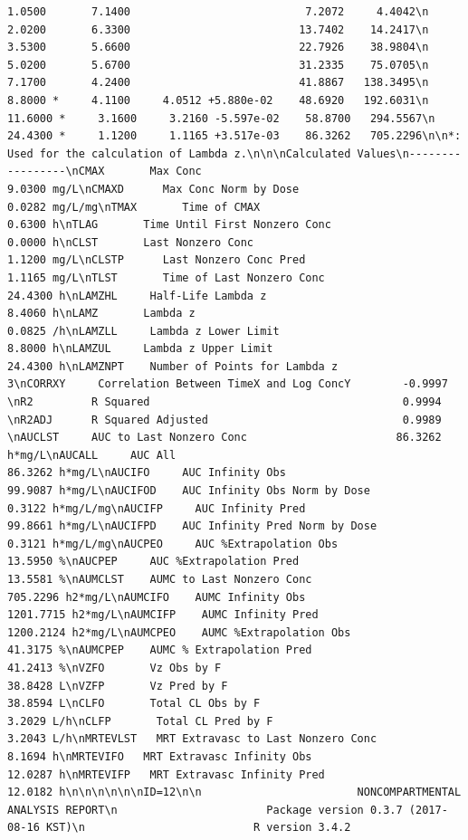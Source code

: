 \documentclass[12pt,]{krantz}
\theoremstyle{definition}
\theoremstyle{definition}
\theoremstyle{definition}
\theoremstyle{remark}
\begin{document}
\begin{verbatim}
1.0500       7.1400                           7.2072     4.4042\n     2.0200       6.3300                          13.7402    14.2417\n     3.5300       5.6600                          22.7926    38.9804\n     5.0200       5.6700                          31.2335    75.0705\n     7.1700       4.2400                          41.8867   138.3495\n     8.8000 *     4.1100     4.0512 +5.880e-02    48.6920   192.6031\n    11.6000 *     3.1600     3.2160 -5.597e-02    58.8700   294.5567\n    24.4300 *     1.1200     1.1165 +3.517e-03    86.3262   705.2296\n\n*: Used for the calculation of Lambda z.\n\n\nCalculated Values\n-----------------\nCMAX       Max Conc                                        9.0300 mg/L\nCMAXD      Max Conc Norm by Dose                           0.0282 mg/L/mg\nTMAX       Time of CMAX                                    0.6300 h\nTLAG       Time Until First Nonzero Conc                   0.0000 h\nCLST       Last Nonzero Conc                               1.1200 mg/L\nCLSTP      Last Nonzero Conc Pred                          1.1165 mg/L\nTLST       Time of Last Nonzero Conc                      24.4300 h\nLAMZHL     Half-Life Lambda z                              8.4060 h\nLAMZ       Lambda z                                        0.0825 /h\nLAMZLL     Lambda z Lower Limit                            8.8000 h\nLAMZUL     Lambda z Upper Limit                           24.4300 h\nLAMZNPT    Number of Points for Lambda z                   3\nCORRXY     Correlation Between TimeX and Log ConcY        -0.9997 \nR2         R Squared                                       0.9994 \nR2ADJ      R Squared Adjusted                              0.9989 \nAUCLST     AUC to Last Nonzero Conc                       86.3262 h*mg/L\nAUCALL     AUC All                                        86.3262 h*mg/L\nAUCIFO     AUC Infinity Obs                               99.9087 h*mg/L\nAUCIFOD    AUC Infinity Obs Norm by Dose                   0.3122 h*mg/L/mg\nAUCIFP     AUC Infinity Pred                              99.8661 h*mg/L\nAUCIFPD    AUC Infinity Pred Norm by Dose                  0.3121 h*mg/L/mg\nAUCPEO     AUC %Extrapolation Obs                         13.5950 %\nAUCPEP     AUC %Extrapolation Pred                        13.5581 %\nAUMCLST    AUMC to Last Nonzero Conc                     705.2296 h2*mg/L\nAUMCIFO    AUMC Infinity Obs                            1201.7715 h2*mg/L\nAUMCIFP    AUMC Infinity Pred                           1200.2124 h2*mg/L\nAUMCPEO    AUMC %Extrapolation Obs                        41.3175 %\nAUMCPEP    AUMC % Extrapolation Pred                      41.2413 %\nVZFO       Vz Obs by F                                    38.8428 L\nVZFP       Vz Pred by F                                   38.8594 L\nCLFO       Total CL Obs by F                               3.2029 L/h\nCLFP       Total CL Pred by F                              3.2043 L/h\nMRTEVLST   MRT Extravasc to Last Nonzero Conc              8.1694 h\nMRTEVIFO   MRT Extravasc Infinity Obs                     12.0287 h\nMRTEVIFP   MRT Extravasc Infinity Pred                    12.0182 h\n\n\n\n\n\nID=12\n\n                        NONCOMPARTMENTAL ANALYSIS REPORT\n                       Package version 0.3.7 (2017-08-16 KST)\n                          R version 3.4.2 
\end{verbatim}
\end{document}
